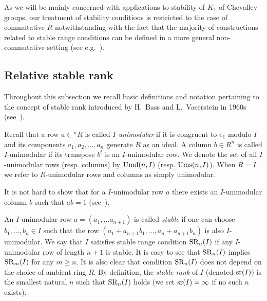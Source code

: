 As we will be mainly concerned with applications to stability of $K_1$ of Chevalley groups, our treatment of stability conditions is restricted to the case of commutative $R$
notwithstanding with the fact that the majority of constructions related to stable range conditions can be defined in a more general non-commutative setting (see e.g.~\cite{Ba64, Va69, Va71}).

\subsection{Relative stable rank}
Throughout this subsection we recall basic definitions and notation pertaining to the concept of stable rank introduced by H.~Bass and L.~Vaserstein in 1960s (see~\cite{Ba64, Va69}).

Recall that a row $a\in{}^n\!R$ is called \emph{$I$-unimodular} if it is congruent to $e_1$ modulo $I$ and its components $a_1,a_2,\ldots,a_n$ generate $R$ as an ideal.
A column $b \in R^n$ is called $I$-unimodular if its transpose $b^t$ is an $I$-unimodular row.
We denote the set of all $I$-unimodular rows (resp. columns) by $\operatorname{Umd}(n, I)$ (resp. $\operatorname{Ums}(n, I)$).
When $R=I$ we refer to $R$-unimodular rows and columns as simply unimodular.

It is not hard to show that for a $I$-unimodular row $a$ there exists an $I$-unimodular column $b$ such that $ab=1$ (see~\cite[\S~2]{Va69}).

An $I$-unimodular row $a=(a_1,\ldots a_{n+1})$ is called \emph{stable} if one can choose $b_1,\ldots,b_n\in I$ such that the row $(a_1+a_{n+1}b_1,\ldots,a_n+a_{n+1}b_n)$ is also $I$-unimodular. 
We say that $I$ satisfies stable range condition $\operatorname{SR}_n(I)$ if any $I$-unimodular row of length $n+1$ is stable.
It is easy to see that $\operatorname{SR}_n(I)$ implies $\operatorname{SR}_m(I)$ for any $m\geqslant n$. 
It is also clear that condition $\operatorname{SR}_n(I)$ does not depend on the choice of ambient ring $R$.
By definition, the {\it stable rank} of $I$ (denoted $\operatorname{sr}(I)$) is the smallest natural $n$ such that $\operatorname{SR}_n(I)$ holds (we set $\operatorname{sr}(I)=\infty$ if no such $n$ exists).

